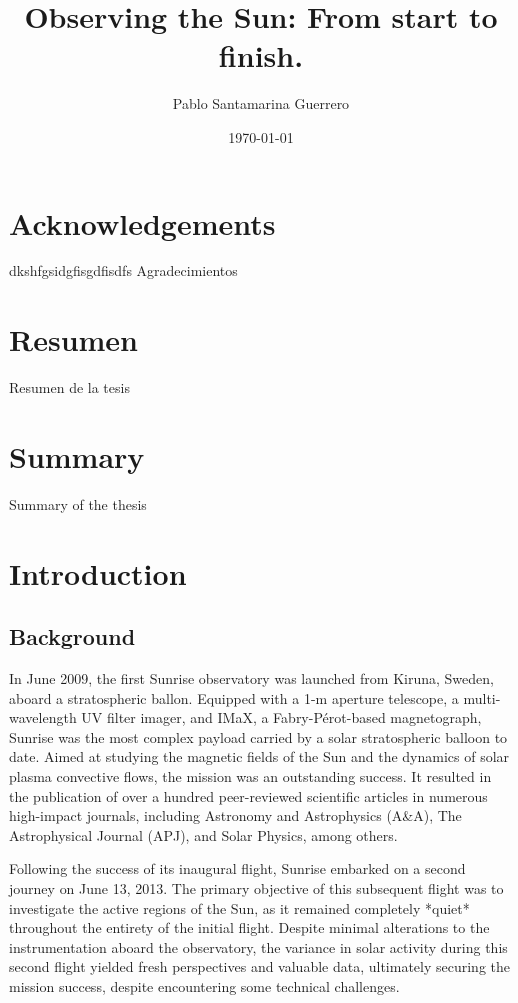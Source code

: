 \documentclass[12pt]{mythesis}
\title{Observing the Sun: From start to finish. }
\author{Pablo Santamarina Guerrero}
\date{\today}
\begin{document}
\frontmatter %
\maketitle
\cleardoublepage

\chapter*{Acknowledgements}
dkshfgsidgfisgdfisdfs
Agradecimientos

\chapter*{Resumen}

Resumen de la tesis

\chapter*{Summary}

Summary of the thesis

\tableofcontents

\mainmatter %
\chapter{Introduction}

\section{Background}

In June 2009, the first Sunrise observatory \citep{SunriseI} was launched from Kiruna, Sweden, aboard a stratospheric ballon. Equipped with a 1-m aperture telescope, a multi-wavelength UV filter imager, and IMaX, a Fabry-Pérot-based magnetograph, Sunrise was the most complex payload carried by a solar stratospheric balloon to date. Aimed at studying the magnetic fields of the Sun and the dynamics of solar plasma convective flows, the mission was an outstanding success. It resulted in the publication of over a hundred peer-reviewed scientific articles in numerous high-impact journals, including Astronomy and Astrophysics (A\&A), The Astrophysical Journal (APJ), and Solar Physics, among others.

Following the success of its inaugural flight, Sunrise embarked on a second journey \citep{SunriseII} on June 13, 2013. The primary objective of this subsequent flight was to investigate the active regions of the Sun, as it remained completely *quiet* throughout the entirety of the initial flight. Despite minimal alterations to the instrumentation aboard the observatory, the variance in solar activity during this second flight yielded fresh perspectives and valuable data, ultimately securing the mission success, despite encountering some technical challenges.
\end{document}
